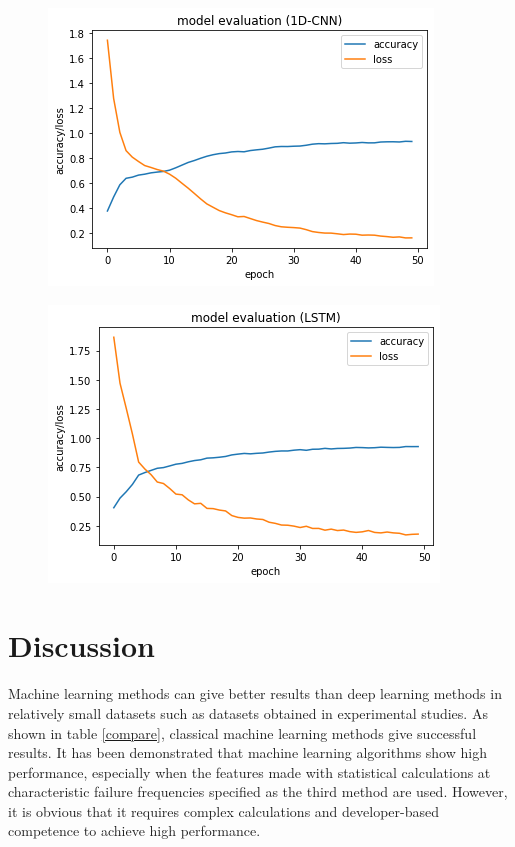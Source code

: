 \begin{figure}[!h]
	\begin{minipage}[b]{.5\linewidth}
		\centering
		\includegraphics[scale=.5]{./fig/cnn_accloss.png}
		\label{tracnn}
	\end{minipage}
	\begin{minipage}[b]{.5\linewidth}
		\centering
		\includegraphics[scale=.5]{./fig/lstmaccloss.png}
		\label{tralstm}
	\end{minipage}
\end{figure}

\section{Discussion}

Machine learning methods can give better results than deep learning methods in relatively small datasets such as datasets obtained in experimental studies. As shown in table \ref{compare}, classical machine learning methods give successful results. It has been demonstrated that machine learning algorithms show high performance, especially when the features made with statistical calculations at characteristic failure frequencies specified as the third method are used. However, it is obvious that it requires complex calculations and developer-based competence to achieve high performance.

